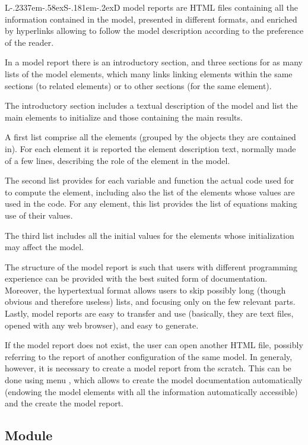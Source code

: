 \documentclass [11pt,a4paper] {book}
\def\LsD{{L\kern-.2337em\lower-.58ex\hbox{S}\kern-.181em\lower-.2ex\hbox{D}}\xspace}
\begin{document}
\LsD model reports are HTML files containing all the information contained in the model, presented in different formats, and enriched by hyperlinks allowing to follow the model description according to the preference of the reader.


In a model report there is an introductory section, and three sections for as many lists of the model elements, which many links linking elements within the same sections (to related elements) or to other sections (for the same element).

The introductory section includes a textual description of the model and list the main elements to initialize and those containing the main results.

A first list comprise all the elements (grouped by the objects they are contained in). For each element it is reported the element description text, normally made of a few lines, describing the role of the element in the model.

The second list provides for each variable and function the actual code used for to compute the element, including also the list of the elements whose values are used in the code. For any element, this list provides the list of equations making use of their values.

The third list includes all the initial values for the elements whose initialization may affect the model.

The structure of the model report is such that users with different programming experience can be provided with the best suited form of documentation. Moreover, the hypertextual format allows users to skip possibly long (though obvious and therefore useless) lists, and focusing only on the few relevant parts. Lastly, model reports are easy to transfer and use (basically, they are text files, opened with any web browser), and easy to generate.

If the model report does not exist, the user can open another HTML file, possibly referring to the report of another configuration of the same model. In generaly, however, it is necessary to create a model report from the scratch. This can be done using menu , which allows to create the model documentation automatically (endowing the model elements with all the information automatically accessible) and the create the model report.


\subsection{Module }
\end{document}
